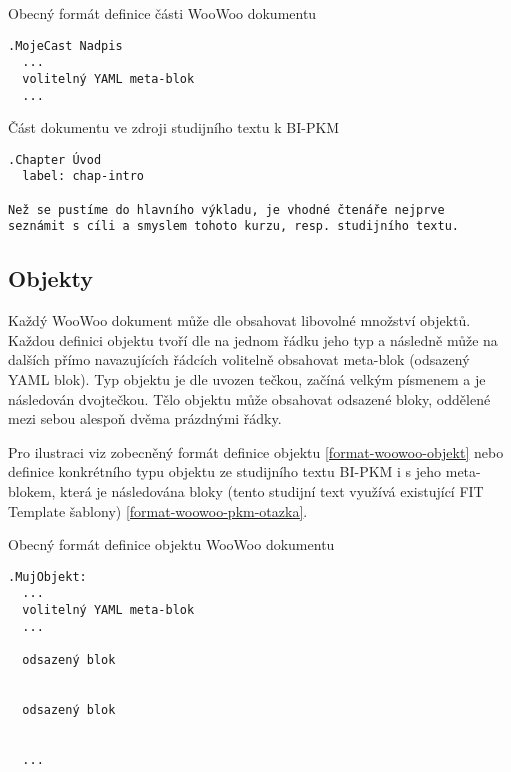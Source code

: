 \begin{listing}
    \caption{Obecný formát definice části WooWoo dokumentu}
    \label{format-woowoo-cast}
    \begin{verbatim}
.MojeCast Nadpis
  ...
  volitelný YAML meta-blok
  ...
    \end{verbatim}
\end{listing}

\begin{listing}
    \caption{Část dokumentu ve zdroji studijního textu k BI-PKM \cite{pkm}}
    \label{format-woowoo-pkm-kapitola}
    \begin{verbatim}
.Chapter Úvod
  label: chap-intro

Než se pustíme do hlavního výkladu, je vhodné čtenáře nejprve
seznámit s cíli a smyslem tohoto kurzu, resp. studijního textu.
    \end{verbatim}
\end{listing}

\subsection{Objekty}

Každý WooWoo dokument může dle \cite{woowoo} obsahovat libovolné množství objektů. Každou definici objektu tvoří dle
\cite{woowoo} na jednom řádku jeho typ a následně může na dalších přímo navazujících řádcích volitelně obsahovat
meta-blok (odsazený YAML blok). Typ objektu je dle \cite{woowoo} uvozen tečkou, začíná velkým písmenem a je následován
dvojtečkou. Tělo objektu může obsahovat odsazené bloky, oddělené mezi sebou alespoň dvěma prázdnými řádky.

Pro ilustraci viz zobecněný formát definice objektu \ref{format-woowoo-objekt} nebo definice konkrétního typu objektu ze
studijního textu BI-PKM i s jeho meta-blokem, která je následována bloky (tento studijní text využívá existující FIT
Template šablony) \ref{format-woowoo-pkm-otazka}.

\begin{listing}
    \caption{Obecný formát definice objektu WooWoo dokumentu}
    \label{format-woowoo-objekt}
    \begin{verbatim}
.MujObjekt:
  ...
  volitelný YAML meta-blok
  ...

  odsazený blok


  odsazený blok


  ...
    \end{verbatim}
\end{listing}

